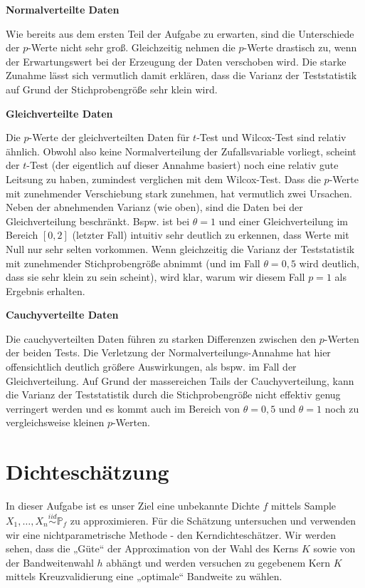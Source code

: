 \documentclass[10pt,]{article}
\begin{document}
\textbf{Normalverteilte Daten}

Wie bereits aus dem ersten Teil der Aufgabe zu erwarten, sind die
Unterschiede der \(p\)-Werte nicht sehr groß. Gleichzeitig nehmen die
\(p\)-Werte drastisch zu, wenn der Erwartungswert bei der Erzeugung der
Daten verschoben wird. Die starke Zunahme lässt sich vermutlich damit
erklären, dass die Varianz der Teststatistik auf Grund der
Stichprobengröße sehr klein wird.

\textbf{Gleichverteilte Daten}

Die \(p\)-Werte der gleichverteilten Daten für \(t\)-Test und
Wilcox-Test sind relativ ähnlich. Obwohl also keine Normalverteilung der
Zufallsvariable vorliegt, scheint der \(t\)-Test (der eigentlich auf
dieser Annahme basiert) noch eine relativ gute Leitsung zu haben,
zumindest verglichen mit dem Wilcox-Test. Dass die \(p\)-Werte mit
zunehmender Verschiebung stark zunehmen, hat vermutlich zwei Ursachen.
Neben der abnehmenden Varianz (wie oben), sind die Daten bei der
Gleichverteilung beschränkt. Bspw. ist bei \(\theta = 1\) und einer
Gleichverteilung im Bereich \([0,2]\) (letzter Fall) intuitiv sehr
deutlich zu erkennen, dass Werte mit Null nur sehr selten vorkommen.
Wenn gleichzeitig die Varianz der Teststatistik mit zunehmender
Stichprobengröße abnimmt (und im Fall \(\theta = 0,5\) wird deutlich,
dass sie sehr klein zu sein scheint), wird klar, warum wir diesem Fall
\(p = 1\) als Ergebnis erhalten.

\textbf{Cauchyverteilte Daten}

Die cauchyverteilten Daten führen zu starken Differenzen zwischen den
\(p\)-Werten der beiden Tests. Die Verletzung der
Normalverteilungs-Annahme hat hier offensichtlich deutlich größere
Auswirkungen, als bspw. im Fall der Gleichverteilung. Auf Grund der
massereichen Tails der Cauchyverteilung, kann die Varianz der
Teststatistik durch die Stichprobengröße nicht effektiv genug verringert
werden und es kommt auch im Bereich von \(\theta = 0,5\) und
\(\theta = 1\) noch zu vergleichsweise kleinen \(p\)-Werten.

\section{Dichteschätzung}\label{dichteschatzung}

In dieser Aufgabe ist es unser Ziel eine unbekannte Dichte \(f\) mittels
Sample \(X_1, \ldots, X_n \overset{iid}{\sim} \mathbb{P}_f\) zu
approximieren. Für die Schätzung untersuchen und verwenden wir eine
nichtparametrische Methode - den Kerndichteschätzer. Wir werden sehen,
dass die „Güte`` der Approximation von der Wahl des Kerns \(K\) sowie
von der Bandweitenwahl \(h\) abhängt und werden versuchen zu gegebenem
Kern \(K\) mittels Kreuzvalidierung eine „optimale`` Bandweite zu
wählen.
\end{document}
